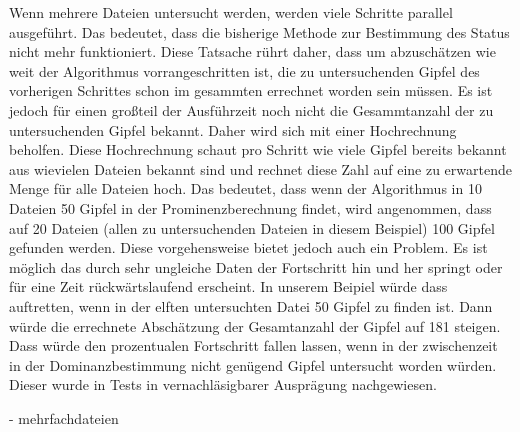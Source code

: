 Wenn mehrere Dateien untersucht werden, werden viele Schritte parallel ausgeführt. Das bedeutet, dass die bisherige Methode zur Bestimmung des Status nicht mehr funktioniert. Diese Tatsache rührt daher, dass um abzuschätzen wie weit der Algorithmus vorrangeschritten ist, die zu untersuchenden Gipfel des vorherigen Schrittes schon im gesammten errechnet worden sein müssen. Es ist jedoch für einen großteil der Ausführzeit noch nicht die Gesammtanzahl der zu untersuchenden Gipfel bekannt. Daher wird sich mit einer Hochrechnung beholfen. Diese Hochrechnung schaut pro Schritt wie viele Gipfel bereits bekannt aus wievielen Dateien bekannt sind und rechnet diese Zahl auf eine zu erwartende Menge für alle Dateien hoch. Das bedeutet, dass wenn der Algorithmus in 10 Dateien 50 Gipfel in der Prominenzberechnung findet, wird angenommen, dass auf 20 Dateien (allen zu untersuchenden Dateien in diesem Beispiel) 100 Gipfel gefunden werden. Diese vorgehensweise bietet jedoch auch ein Problem. Es ist möglich das durch sehr ungleiche Daten der Fortschritt hin und her springt oder für eine Zeit rückwärtslaufend erscheint. In unserem Beipiel würde dass auftretten, wenn in der elften untersuchten Datei 50 Gipfel zu finden ist. Dann würde die errechnete Abschätzung der Gesamtanzahl der Gipfel auf 181 steigen. Dass würde den prozentualen Fortschritt fallen lassen, wenn in der zwischenzeit in der Dominanzbestimmung nicht genügend Gipfel untersucht worden würden. Dieser wurde in Tests in vernachläsigbarer Ausprägung nachgewiesen.


- mehrfachdateien